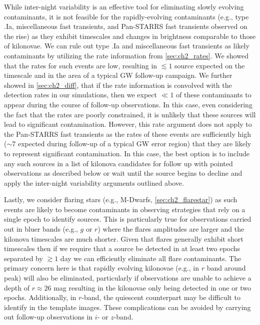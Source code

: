 While inter-night variability is an effective tool for eliminating slowly evolving contaminants, it is not feasible for the rapidly-evolving contaminants (e.g., type .Ia, miscellaneous fast transients, and Pan-STARRS fast transients observed on the rise) as they exhibit timescales and changes in brightness comparable to those of kilonovae. We can rule out type .Ia and miscellaneous fast transients as likely contaminants by utilizing the rate information from \autoref{sec:ch2_rates}. We showed that the rates for such events are low, resulting in $\lesssim1$ source expected on the timescale and in the area of a typical GW follow-up campaign. We further showed in \autoref{sec:ch2_diff}, that if the rate information is convolved with the detection rates in our simulations, then we expect $\ll 1$ of these contaminants to appear during the course of follow-up observations. In this case, even considering the fact that the rates are poorly constrained, it is unlikely that these sources will lead to significant contamination. However, this rate argument does not apply to the Pan-STARRS fast transients as the rates of these events are sufficiently high ($\sim 7$ expected during follow-up of a typical GW error region) that they are likely to represent significant contamination. In this case, the best option is to include any such sources in a list of kilonova candidates for follow up with pointed observations as described below or wait until the source begins to decline and apply the inter-night variability arguments outlined above.

Lastly, we consider flaring stars (e.g., M-Dwarfs, \autoref{sec:ch2_flarestar}) as such events are likely to become contaminants in observing strategies that rely on a single epoch to identify sources. This is particularly true for observations carried out in bluer bands (e.g., $g$ or $r$) where the flares amplitudes are larger and the kilonova timescales are much shorter. Given that flares generally exhibit short timescales \citep[minutes to hours][]{Berger+13} then if we require that a source be detected in at least two epochs separated by $\gtrsim1$ day we can efficiently eliminate all flare contaminants. The primary concern here is that rapidly evolving kilonovae (e.g., in $r$ band around peak) will also be eliminated, particularly if observations are unable to achieve a depth of $r\approx26$ mag resulting in the kilonovae only being detected in one or two epochs. Additionally, in $r$-band, the quiescent counterpart may be difficult to identify in the template images. These complications can be avoided by carrying out follow-up observations in $i$- or $z$-band.

